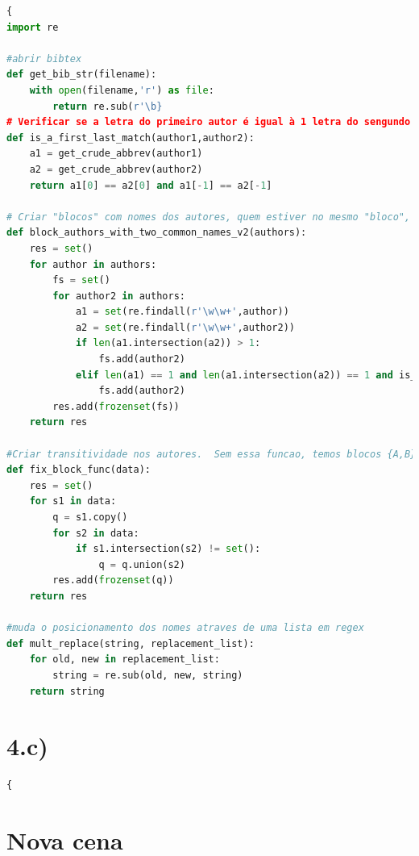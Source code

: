 \documentclass[11pt,a4paper]{report}
\begin{document}
\begin{lstlisting}[language=python]{
import re

#abrir bibtex
def get_bib_str(filename):
    with open(filename,'r') as file:
        return re.sub(r'\b}
# Verificar se a letra do primeiro autor é igual à 1 letra do sengundo autor e o mesmo para a 2 letra 
def is_a_first_last_match(author1,author2):
    a1 = get_crude_abbrev(author1)
    a2 = get_crude_abbrev(author2)
    return a1[0] == a2[0] and a1[-1] == a2[-1]

# Criar "blocos" com nomes dos autores, quem estiver no mesmo "bloco", é a mesma pessoa.
def block_authors_with_two_common_names_v2(authors):
    res = set()
    for author in authors:
        fs = set()
        for author2 in authors:
            a1 = set(re.findall(r'\w\w+',author))
            a2 = set(re.findall(r'\w\w+',author2))
            if len(a1.intersection(a2)) > 1:
                fs.add(author2)
            elif len(a1) == 1 and len(a1.intersection(a2)) == 1 and is_a_first_last_match(author,author2):
                fs.add(author2)
        res.add(frozenset(fs))
    return res

#Criar transitividade nos autores.  Sem essa funcao, temos blocos {A,B} e {B,C} Depois dessa funcao, vamos ter {A,B,C}
def fix_block_func(data):
    res = set()
    for s1 in data:
        q = s1.copy()
        for s2 in data:
            if s1.intersection(s2) != set():
                q = q.union(s2)
        res.add(frozenset(q))
    return res

#muda o posicionamento dos nomes atraves de uma lista em regex
def mult_replace(string, replacement_list):
    for old, new in replacement_list:
        string = re.sub(old, new, string)
    return string

\end{lstlisting}

\section{4.c)}
\begin{lstlisting}[language=python]{


\end{lstlisting}
\section{Nova cena}
\end{document}
